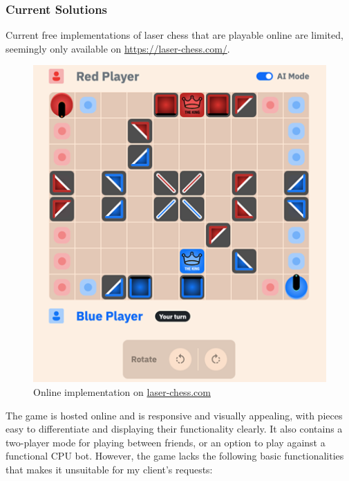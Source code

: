 \documentclass[../main/main.tex]{subfiles}
\begin{document}
\subsubsection{Current Solutions}
Current free implementations of laser chess that are playable online are limited, seemingly only available on \url{https://laser-chess.com/}.

\begin{figure}[H]
    \centering
    \includegraphics[width=0.6\columnwidth]{../analysis/assets/laser_chess_com.png}
    \caption{Online implementation on \href{https://laser-chess.com/}{laser-chess.com}}
    \label{fig:laser-chess-com}
\end{figure}

The game is hosted online and is responsive and visually appealing, with pieces easy to differentiate and displaying their functionality clearly. It also contains a two-player mode for playing between friends, or an option to play against a functional CPU bot. However, the game lacks the following basic functionalities that makes it unsuitable for my client’s requests:
\end{document}
